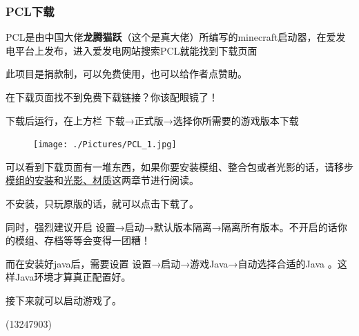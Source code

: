 \documentclass[UTF8,a4paper]{article}
\begin{document}
			\subsubsection{PCL下载}
				\par PCL是由中国大佬\textbf{龙腾猫跃}（这个是真大佬）所编写的minecraft启动器，在爱发电平台上发布，进入爱发电网站搜索PCL就能找到下载页面
				\par 此项目是捐款制，可以免费使用，也可以给作者点赞助。
				\par 在下载页面找不到免费下载链接？你该配眼镜了！
				\par 下载后运行，在上方栏 下载→正式版→选择你所需要的游戏版本下载
				\begin{figure}[H] %
					\centering %
					\texttt{[image: ./Pictures/PCL\_1.jpg]} %
				\end{figure}
				\par 可以看到下载页面有一堆东西，如果你要安装模组、整合包或者光影的话，请移步\hyperlink{modsinstall}{模组的安装}和\hyperlink{guangying}{光影、材质}这两章节进行阅读。
				\par 不安装，只玩原版的话，就可以点击下载了。
				\par 同时，强烈建议开启 设置→启动→默认版本隔离→隔离所有版本。不开启的话你的模组、存档等等会变得一团糟！
				\par 而在安装好java后，需要设置 设置→启动→游戏Java→自动选择合适的Java 。这样Java环境才算真正配置好。
				\par 接下来就可以启动游戏了。
				\begin{flushright}(13247903)\end{flushright}
\end{document}
